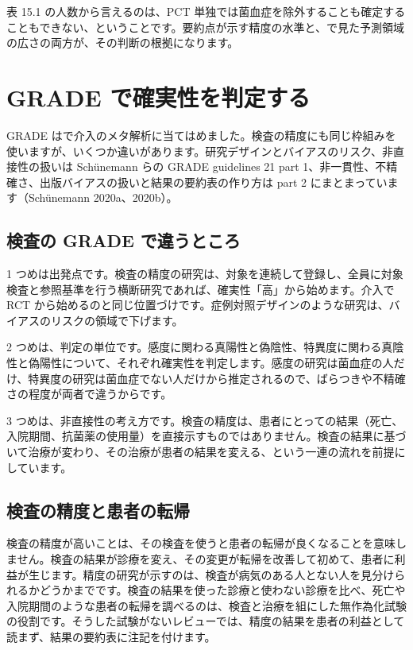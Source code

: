 表 15.1 の人数から言えるのは、PCT 単独では菌血症を除外することも確定することもできない、ということです。要約点が示す精度の水準と、で見た予測領域の広さの両方が、その判断の根拠になります。

\section{GRADE で確実性を判定する}
\label{sec:15-2}

GRADE はで介入のメタ解析に当てはめました。検査の精度にも同じ枠組みを使いますが、いくつか違いがあります。研究デザインとバイアスのリスク、非直接性の扱いは Schünemann らの GRADE guidelines 21 part 1、非一貫性、不精確さ、出版バイアスの扱いと結果の要約表の作り方は part 2 にまとまっています（Schünemann 2020a、2020b）。

\subsection{検査の GRADE で違うところ}
\label{sec:15-2-1}

1 つめは出発点です。検査の精度の研究は、対象を連続して登録し、全員に対象検査と参照基準を行う横断研究であれば、確実性「高」から始めます。介入で RCT から始めるのと同じ位置づけです。症例対照デザインのような研究は、バイアスのリスクの領域で下げます。

2 つめは、判定の単位です。感度に関わる真陽性と偽陰性、特異度に関わる真陰性と偽陽性について、それぞれ確実性を判定します。感度の研究は菌血症の人だけ、特異度の研究は菌血症でない人だけから推定されるので、ばらつきや不精確さの程度が両者で違うからです。

3 つめは、非直接性の考え方です。検査の精度は、患者にとっての結果（死亡、入院期間、抗菌薬の使用量）を直接示すものではありません。検査の結果に基づいて治療が変わり、その治療が患者の結果を変える、という一連の流れを前提にしています。

\subsection{検査の精度と患者の転帰}
\label{sec:15-2-2}

検査の精度が高いことは、その検査を使うと患者の転帰が良くなることを意味しません。検査の結果が診療を変え、その変更が転帰を改善して初めて、患者に利益が生じます。精度の研究が示すのは、検査が病気のある人とない人を見分けられるかどうかまでです。検査の結果を使った診療と使わない診療を比べ、死亡や入院期間のような患者の転帰を調べるのは、検査と治療を組にした無作為化試験の役割です。そうした試験がないレビューでは、精度の結果を患者の利益として読まず、結果の要約表に注記を付けます。

